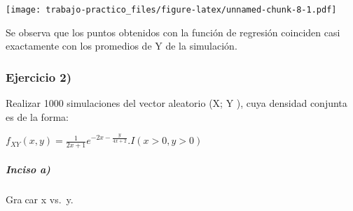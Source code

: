 \documentclass[
]{article}
\newenvironment{Shaded}{\begin{snugshade}}{\end{snugshade}}
\newcommand{\AttributeTok}[1]{\textcolor[rgb]{0.77,0.63,0.00}{#1}}
\newcommand{\DecValTok}[1]{\textcolor[rgb]{0.00,0.00,0.81}{#1}}
\newcommand{\FunctionTok}[1]{\textcolor[rgb]{0.00,0.00,0.00}{#1}}
\newcommand{\NormalTok}[1]{#1}
\newcommand{\SpecialCharTok}[1]{\textcolor[rgb]{0.00,0.00,0.00}{#1}}
\newcommand{\StringTok}[1]{\textcolor[rgb]{0.31,0.60,0.02}{#1}}
\begin{document}
\begin{Shaded}
\end{Shaded}

\texttt{[image: trabajo-practico\_files/figure-latex/unnamed-chunk-8-1.pdf]}

Se observa que los puntos obtenidos con la función de regresión
coinciden casi exactamente con los promedios de Y de la simulación.

\hypertarget{ejercicio-2}{%
\subsubsection{Ejercicio 2)}\label{ejercicio-2}}

Realizar 1000 simulaciones del vector aleatorio (X; Y ), cuya densidad
conjunta es de la forma:

\(f_{XY}(x,y)= \frac{1}{2x+1} e^{-2x-\frac{y}{4x+2}}.I(x>0, y>0)\)

\hypertarget{inciso-a-1}{%
\subparagraph{Inciso a)}\label{inciso-a-1}}

Gracar x vs.~y.
\end{document}
